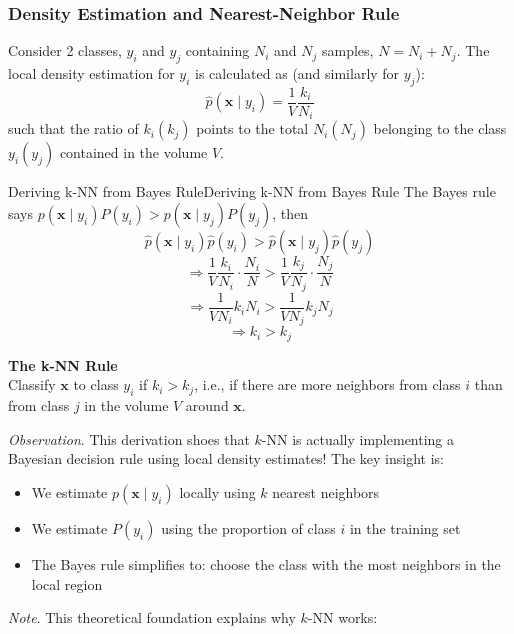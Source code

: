 \documentclass[a4paper]{article}
\theoremstyle{definition}
\begin{document}
\subsubsection{Density Estimation and Nearest-Neighbor Rule}
Consider 2 classes, \( y_i \) and \( y_j \) containing \( N_i \) and \( N_j \) samples, \( N = N_i + N_j \).
\vspace{1em}
\noindent
\newline
The local density estimation for \( y_i \) is calculated as (and similarly for \( y_j \)):
\[
  \hat{p}(\mathbf{x}\;|\;y_i) = \frac{1}{V} \frac{k_i}{N_i}
\]
such that the ratio of \( k_i(k_j) \) points to the total \( N_i (N_j) \) belonging to the class \( y_i (y_j) \) contained 
in the volume \( V \).
\begin{definition}{Deriving k-NN from Bayes Rule}{Deriving k-NN from Bayes Rule}
The Bayes rule says \( p(\mathbf{x}\;|\;y_i)P(y_i) > p(\mathbf{x}\;|\;y_j)P(y_j) \), then 
\[
  \hat{p}(\mathbf{x}\;|\;y_i)\hat{p}(y_i) > \hat{p}(\mathbf{x}\;|\;y_j)\hat{p}(y_j)
\]
\[
  \Rightarrow \frac{1}{V} \frac{k_i}{N_i} \cdot \frac{N_i}{N} > \frac{1}{V} \frac{k_j}{N_j} \cdot \frac{N_j}{N}
\]
\[
  \Rightarrow \frac{1}{VN_i} k_iN_i > \frac{1}{VN_j} k_jN_j
\]
\[
  \Rightarrow k_i > k_j
\]
\end{definition}
\begin{tcolorbox}[
    colback=magenta!15!white,
    colframe=magenta!15!white,
    boxrule=0pt,
    arc=0pt,
    halign=center
]
    \textbf{The k-NN Rule}\\[0.6em]
    Classify \( \mathbf{x} \) to class \( y_i \) if \( k_i > k_j \), i.e., if there are more neighbors from class \( i \) than
    from class \( j \) in the volume \( V \) around \( \mathbf{x} \).
\end{tcolorbox}
\textit{Observation}. This derivation shoes that \( k \)-NN is actually implementing a Bayesian decision rule using local density estimates! 
The key insight is:
\begin{itemize}
    \item We estimate \( p(\mathbf{x}\;|\;y_i) \) locally using \( k \) nearest neighbors 
    \item We estimate \( P(y_i) \) using the proportion of class \( i \) in the training set 
    \item The Bayes rule simplifies to: choose the class with the most neighbors in the local region 
\end{itemize}
\textit{Note}. This theoretical foundation explains why \( k \)-NN works:
\end{document}
